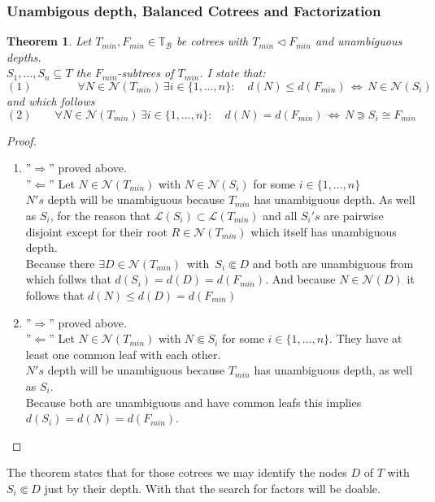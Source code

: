 \documentclass[a4paper,12pt]{article}
\newtheorem{theorem}{Theorem}[section]
\theoremstyle{definition}
\begin{document}
		\subsubsection{Unambigous depth, Balanced Cotrees and Factorization}
		\begin{theorem}
			Let $T_{min},F_{min}\in\mathds{T}_{\mathcal{B}}$ be cotrees with $T_{min}\vartriangleleft F_{min}$ and unambiguous depths.\\ $S_1,...,S_n\subseteq T$ the $F_{min}$-subtrees of $T_{min}$. I state that:
			\[(1)\qquad \qquad \forall N\in \mathcal{N}(T_{min})\, \exists i\in\{1,...,n\}:\quad d(N)\leq d(F_{min})\,\Longleftrightarrow\, N\in \mathcal{N}(S_i) \]
			and which follows
			\[(2)\qquad \forall N\in \mathcal{N}(T_{min})\, \exists i\in\{1,...,n\}:\quad d(N)= d(F_{min})\,\Longleftrightarrow\, N \Supset S_i\cong F_{min} \]
		\end{theorem}
	\begin{proof}
		\begin{enumerate}[(1)]
			\item ''$\Rightarrow$'' proved above.\\
			''$\Leftarrow$'' Let $N\in\mathcal{N}(T_{min})$ with $N\in \mathcal{N}(S_i)$ for some $i\in\{1,...,n\}$\\
			$N's$ depth will be unambiguous because $T_{min}$ has unambiguous depth. As well as $S_i$, for the reason that $\mathcal{L}(S_i)\subset \mathcal{L}(T_{min})$ and all $S_i's$ are pairwise disjoint except for their root $R\in \mathcal{N}(T_{min})$ which itself has unambiguous depth.\\
			Because there $\exists D\in \mathcal{N}(T_{min})\,  $ with $\,S_i\Subset D$ and both are unambiguous from which follws that $d(S_i)=d(D)=d(F_{min})$. And because $N\in \mathcal{N}(D)$ it follows that $d(N)\leq d(D)=d(F_{min})$ 
			\item ''$\Rightarrow$'' proved above.\\
			''$\Leftarrow$'' Let $N\in\mathcal{N}(T_{min})$ with $N \Subset S_i$ for some $i\in\{1,...,n\}$. They have at least one common leaf with each other.\\
			$N's$ depth will be unambiguous because $T_{min}$ has unambiguous depth, as well as $S_i$.\\
			Because both are unambiguous and have common leafs this implies $d(S_i)=d(N)=d(F_{min})$.
		\end{enumerate}
	\end{proof}
		The theorem states that for those cotrees we may identify the nodes $D$ of $T$ with $S_i \Subset D$ just by their depth. With that the search for factors will be doable.\\
\end{document}
